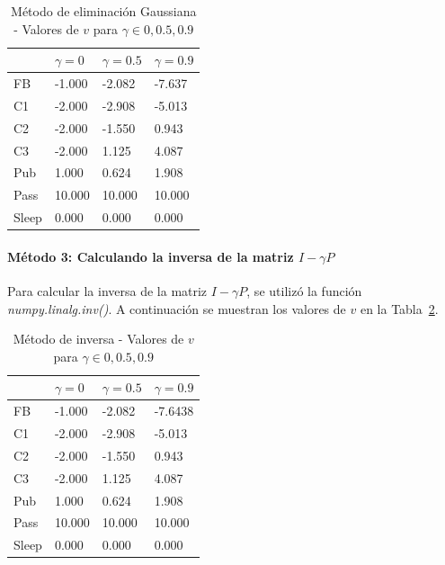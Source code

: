 \begin{table}[H]
    \centering
    \caption{Método de eliminación Gaussiana - Valores de $v$ para $\gamma \in {0,0.5,0.9}$}
    \label{tab:v_gauss}
    \begin{tabular}{l|l|l|l}
        & $\gamma=0$ & $\gamma=0.5$ & $\gamma=0.9$ \\ \hline
        FB    & -1.000    & -2.082         & -7.637         \\ \hline
        C1    & -2.000    & -2.908         & -5.013         \\ \hline
        C2    & -2.000    & -1.550         & 0.943         \\ \hline
        C3    & -2.000    & 1.125         & 4.087         \\ \hline
        Pub   & 1.000     & 0.624          & 1.908          \\ \hline
        Pass  & 10.000    & 10.000           & 10.000           \\ \hline
        Sleep & 0.000     & 0.000            & 0.000
    \end{tabular}
  \end{table}

\paragraph{Método 3: Calculando la inversa de la matriz $I - \gamma P$}
Para calcular la inversa de la matriz $I - \gamma P$, se utilizó la función \textit{numpy.linalg.inv()}.
A continuación se muestran los valores de $v$ en la Tabla~\ref{tab:v_inv}\footnotemark.


\begin{table}[H]
    \centering
    \caption{Método de inversa - Valores de $v$ para $\gamma \in {0,0.5,0.9}$}
    \label{tab:v_inv}
    \begin{tabular}{l|l|l|l}
        & $\gamma=0$ & $\gamma=0.5$ & $\gamma=0.9$ \\ \hline
        FB    & -1.000    & -2.082         & -7.6438         \\ \hline
        C1    & -2.000    & -2.908         & -5.013         \\ \hline
        C2    & -2.000    & -1.550         & 0.943         \\ \hline
        C3    & -2.000    & 1.125         & 4.087         \\ \hline
        Pub   & 1.000     & 0.624          & 1.908          \\ \hline
        Pass  & 10.000    & 10.000           & 10.000           \\ \hline
        Sleep & 0.000     & 0.000            & 0.000
    \end{tabular}
\end{table}

